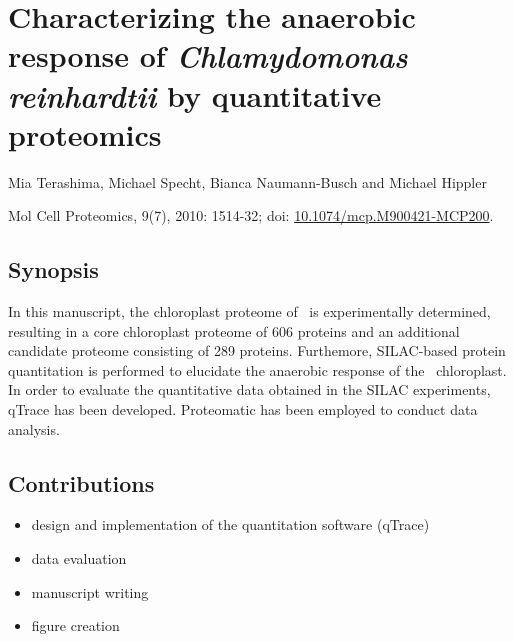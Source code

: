 \section{Characterizing the anaerobic response of {\em Chlamydomonas reinhardtii} by quantitative proteomics}

Mia Terashima, Michael Specht, Bianca Naumann-Busch and Michael Hippler

Mol Cell Proteomics, 9(7), 2010: 1514-32; doi: \href{http://dx.doi.org/10.1074/mcp.M900421-MCP200}{10.1074/mcp.M900421-MCP200}.

\subsection*{Synopsis}

In this manuscript, the chloroplast proteome of \cre~is experimentally 
determined, resulting in a core chloroplast proteome of 606 proteins and
an additional candidate proteome consisting of 289 proteins.
Furthemore, SILAC-based protein quantitation is performed to elucidate 
the anaerobic response of the \cre~chloroplast.
In order to evaluate the quantitative data obtained in the SILAC experiments,
qTrace has been developed.
Proteomatic has been employed to conduct data analysis.

\subsection*{Contributions}

\begin{itemize}
\item design and implementation of the quantitation software (qTrace)
\item data evaluation
\item manuscript writing
\item figure creation
\end{itemize}

{}

\cleardoublepage
